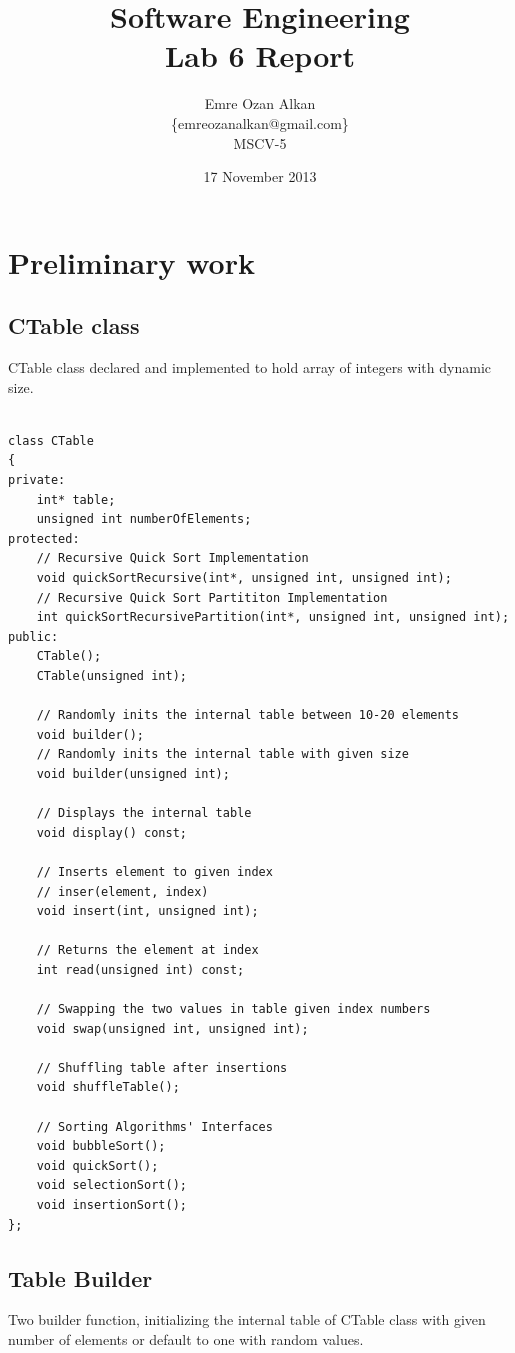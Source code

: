 \documentclass{article}
\title{Software Engineering\\
		Lab 6 Report}
\author{Emre Ozan Alkan\\
		\{emreozanalkan@gmail.com\}\\
		MSCV-5}
\date{17 November 2013}
\begin{document}
\maketitle

\section{Preliminary work}

	\subsection{CTable class}
	CTable class declared and implemented to hold array of integers with dynamic size.
	
	\begin{lstlisting}[label=CTable-h, caption=CTable.h]
	
class CTable
{
private:
    int* table;
    unsigned int numberOfElements;
protected:
    // Recursive Quick Sort Implementation
    void quickSortRecursive(int*, unsigned int, unsigned int);
    // Recursive Quick Sort Partititon Implementation
    int quickSortRecursivePartition(int*, unsigned int, unsigned int);
public:
    CTable();
    CTable(unsigned int);

    // Randomly inits the internal table between 10-20 elements
    void builder();
    // Randomly inits the internal table with given size
    void builder(unsigned int);

    // Displays the internal table
    void display() const;

    // Inserts element to given index
    // inser(element, index)
    void insert(int, unsigned int);

    // Returns the element at index
    int read(unsigned int) const;

    // Swapping the two values in table given index numbers
    void swap(unsigned int, unsigned int);

    // Shuffling table after insertions
    void shuffleTable();

    // Sorting Algorithms' Interfaces
    void bubbleSort();
    void quickSort();
    void selectionSort();
    void insertionSort();
};

	\end{lstlisting}
	
	
	\subsection{Table Builder}
	Two builder function, initializing the internal table of CTable class with given number of elements or default to one with random values.
	
\end{document}
